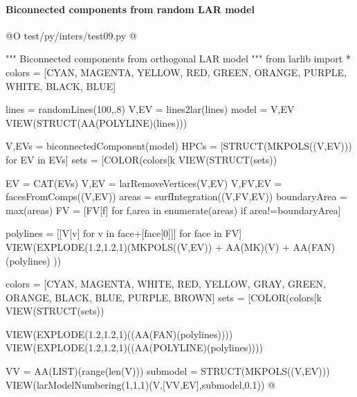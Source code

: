 \documentclass[11pt,oneside]{article}    %
\begin{document}
\paragraph{Biconnected components from random LAR model}
@O test/py/inters/test09.py
@{""" Biconnected components from orthogonal LAR model """
from larlib import *
colors = [CYAN, MAGENTA, YELLOW, RED, GREEN, ORANGE, PURPLE, WHITE, BLACK, BLUE]

lines = randomLines(100,.8)
V,EV = lines2lar(lines)
model = V,EV
VIEW(STRUCT(AA(POLYLINE)(lines)))

V,EVs = biconnectedComponent(model)
HPCs = [STRUCT(MKPOLS((V,EV))) for EV in EVs]
sets = [COLOR(colors[k%
VIEW(STRUCT(sets))

EV = CAT(EVs)
V,EV = larRemoveVertices(V,EV)
V,FV,EV = facesFromComps((V,EV))
areas = surfIntegration((V,FV,EV))
boundaryArea = max(areas)
FV = [FV[f] for f,area in enumerate(areas) if area!=boundaryArea]

polylines = [[V[v] for v in face+[face[0]]] for face in FV]
VIEW(EXPLODE(1.2,1.2,1)(MKPOLS((V,EV)) + AA(MK)(V) + AA(FAN)(polylines) ))

colors = [CYAN, MAGENTA, WHITE, RED, YELLOW, GRAY, GREEN, ORANGE, BLACK, BLUE, PURPLE, BROWN]
sets = [COLOR(colors[k%
VIEW(STRUCT(sets))


VIEW(EXPLODE(1.2,1.2,1)((AA(FAN)(polylines))))
VIEW(EXPLODE(1.2,1.2,1)((AA(POLYLINE)(polylines))))

VV = AA(LIST)(range(len(V)))
submodel = STRUCT(MKPOLS((V,EV)))
VIEW(larModelNumbering(1,1,1)(V,[VV,EV],submodel,0.1))
@}
\end{document}

